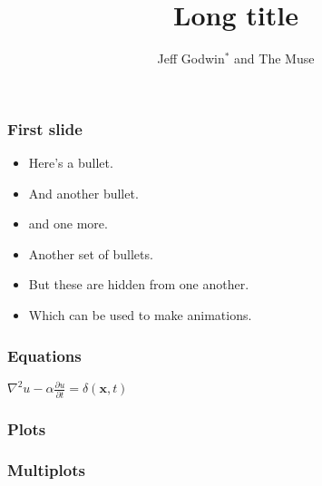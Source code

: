 \title[Short title]{Long title}
\author{Jeff Godwin$^*$ and The Muse}
\date{}

\maketitle

\begin{frame} \frametitle{First slide}
    \begin{itemize}
        \item Here's a bullet.
        \item And another bullet.
        \item and one more.
    \end{itemize}
    \pause
    \begin{itemize}
        \item Another set of bullets.
            \pause
        \item But these are hidden from one another.
            \pause
        \item Which can be used to make animations.
    \end{itemize}
\end{frame}

\begin{frame} \frametitle{Equations}
    \Huge{$\nabla^2 u - \alpha \frac{\partial u}{\partial t} = \delta(\mathbf{x},t)$}
\end{frame}

\begin{frame} \frametitle{Plots}
\end{frame}

\begin{frame} \frametitle{Multiplots}
\end{frame}
